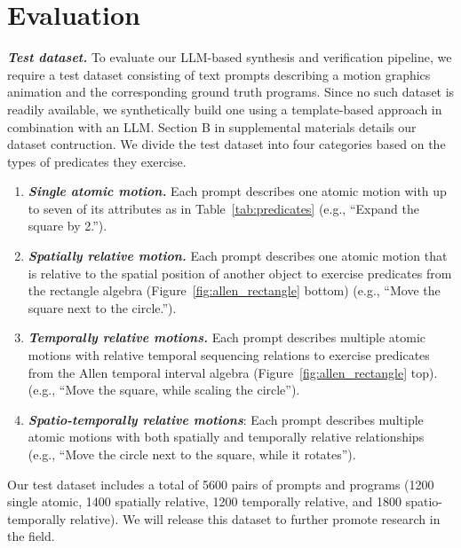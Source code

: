 \section{Evaluation}
\label{sec:evaluation}


\vspace{0.5em}
\noindent
{\bf \em Test dataset.}
To evaluate our LLM-based synthesis and verification pipeline, we
require a test dataset consisting of text prompts describing a motion
graphics animation and the corresponding ground truth \dslname{}
programs.
%
Since no such dataset is readily available, we synthetically
build one using a template-based approach in combination with an
LLM. Section B in supplemental materials details our
dataset contruction. %
%
%
We divide the test dataset into four categories based on the
types of \dslname{} predicates they exercise.
\begin{enumerate}[leftmargin=0.5cm]
    \item {\bf \em Single atomic motion.}  Each prompt describes
      one atomic motion with up to seven of its attributes as in Table~\ref{tab:predicates} (e.g., ``Expand the square by 2.'').
      
    \item {\bf \em Spatially relative motion.}  Each prompt
      describes one atomic motion that is relative to the spatial
      position of another object to exercise predicates from the
      rectangle algebra (Figure~\ref{fig:allen_rectangle} bottom) (e.g., ``Move the square next to the circle.'').
    
    \item {\bf \em Temporally relative motions.}  Each prompt describes 
      multiple atomic motions with relative temporal sequencing relations to
      exercise predicates from the Allen temporal interval algebra (Figure~\ref{fig:allen_rectangle} top). (e.g., ``Move the square,
      while scaling the circle'').
    
    \item {\bf \em  Spatio-temporally relative motions}: Each prompt
      describes multiple atomic motions with both spatially and temporally relative
      relationships (e.g., ``Move the circle next to the square, while it rotates'').
\end{enumerate}
\noindent
Our test dataset includes a total of 5600 pairs of prompts and \dslname{} programs (1200 single
atomic, 1400 spatially relative, 1200 temporally
relative, and 1800 spatio-temporally relative).
%
%
We will release this dataset to further promote research in the field.


